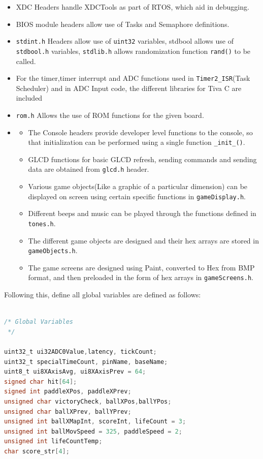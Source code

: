 \documentclass{article}
\begin{document}
\begin{itemize}
  \item XDC Headers handle XDCTools as part of RTOS, which aid in debugging.
  \item BIOS module headers allow use of Tasks and Semaphore definitions.
  \item \texttt{stdint.h} Headers allow use of \texttt{uint32} variables, stdbool allows use of \texttt{stdbool.h} variables, \texttt{stdlib.h} allows randomization function \texttt{rand()} to be called.
  \item For the timer,timer interrupt and ADC functions used in \texttt{Timer2\_ISR}(Task Scheduler) and in ADC Input code, the different libraries for Tiva C are included
  \item \texttt{rom.h} Allows the use of ROM functions for the given board.
  \item \begin{itemize}
    \item The Console headers provide developer level functions to the console, so that initialization can be performed using a single function \texttt{\_init\_()}.
    \item GLCD functions for basic GLCD refresh, sending commands and sending data are obtained from \texttt{glcd.h} header.
    \item Various game objects(Like a graphic of a particular dimension) can be displayed on screen using certain specific functions in \texttt{gameDisplay.h}.
    \item Different beeps and music can be played through the functions defined in \texttt{tones.h}.
    \item The different game objects are designed and their hex arrays are stored in \texttt{gameObjects.h}.
    \item The game screens are designed using Paint, converted to Hex from BMP format, and then preloaded in the form of hex arrays in \texttt{gameScreens.h}.
  \end{itemize}
\end{itemize}
\qquad Following this, define all global variables are defined as follows:
  \begin{lstlisting}[basicstyle = \small, language = C]

/* Global Variables
 */

uint32_t ui32ADC0Value,latency, tickCount; 
uint32_t specialTimeCount, pinName, baseName;
uint8_t ui8XAxisAvg, ui8XAxisPrev = 64;
signed char hit[64];
signed int paddleXPos, paddleXPrev;
unsigned char victoryCheck, ballXPos,ballYPos;
unsigned char ballXPrev, ballYPrev;
unsigned int ballXMapInt, scoreInt, lifeCount = 3;
unsigned int ballMovSpeed = 325, paddleSpeed = 2;
unsigned int lifeCountTemp;
char score_str[4];
  \end{lstlisting}
\end{document}
